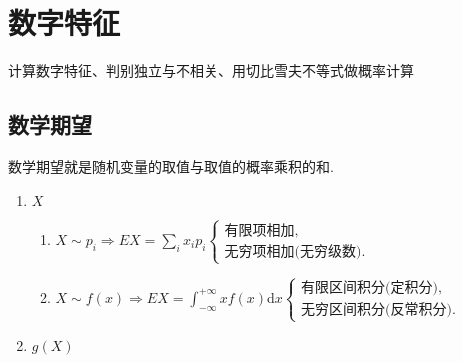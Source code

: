 \chapter{数字特征}

计算数字特征、判别独立与不相关、用切比雪夫不等式做概率计算

\section{数学期望}
数学期望就是随机变量的取值与取值的概率乘积的和.
\begin{enumerate}
      \item $X$
            \begin{enumerate}
                  \item $X\sim p_{i}\Rightarrow EX=\sum_{i}x_{i}p_{i}\begin{cases}\text{有限项相加,}\\\text{无穷项相加(无穷级数).}\end{cases}$
                  \item $X\sim f(x)\Rightarrow EX=\int_{-\infty}^{+\infty}xf(x)$d$x\begin{cases}\text{有限区间积分(定积分),}\\\text{无穷区间积分(反常积分).}\end{cases}$
            \end{enumerate}
      \item $g(X)$


\end{enumerate}

